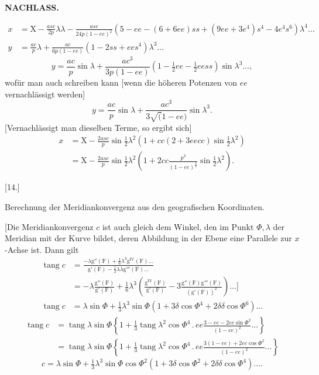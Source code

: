 \par\clearpage
\noindent{}\hfill{\small\textbf{NACHLASS.}}\hfill\null\par\medskip

\[
\begin{aligned}
x&=\mathrm X-\frac{asc}{2p}\lambda\lambda-\frac{asc}{24p(1-ee)^2}
 (5-ee-(6+6ee)ss+(9ee+3e^4)s^4-4e^4s^6)\lambda^4\ldots\\
y&=\frac{ac}{p}\lambda+\frac{ac}{6p(1-ee)}(1-2ss+ees^4)\lambda^3\ldots
\end{aligned}
\]
\noindent [oder]
\[
y=\frac{ac}{p}\sin\lambda+\frac{ac^3}{3p(1-ee)}
 (1-\tfrac12ee-\tfrac12eess)\sin\lambda^3\ldots,
\]
\noindent wofür man auch schreiben kann [wenn die höheren Potenzen von \(ee\) vernachlässigt werden]
\[
y=\frac{ac}{p}\sin\lambda+\frac{ac^3}{3\surd(1-ee)}\sin\lambda^3.
\]
[Vernachlässigt man dieselben Terme, so ergibt sich]
\[
\begin{aligned}
x&=\mathrm X-\frac{2asc}{p}\sin\tfrac12\lambda^2
 \left(1+cc(2+3eecc)\sin\tfrac12\lambda^2\right)\\
 &=\mathrm X-\frac{2asc}{p}\sin\tfrac12\lambda^2
 \left(1+2cc\frac{p^3}{(1-ee)^{\frac32}}\sin\tfrac12\lambda^2\right).
\end{aligned}
\]

\begin{center}
[14.]\par\medskip
Berechnung der Meridiankonvergenz aus den geografischen Koordinaten.
\end{center}
[Die Meridiankonvergenz \(c\) ist auch gleich dem Winkel, den im Punkt \(\Phi,\lambda\)
der Meridian mit der Kurve bildet, deren Abbildung in der Ebene eine Parallele
zur \(x\)-Achse ist. Dann gilt
\[
\begin{aligned}
\operatorname{tang}c&=\frac{-\lambda\mathrm g''(\mathrm F)+\tfrac16\lambda^3\mathrm g^{\mathrm{IV}}(\mathrm F)\ldots}
 {\mathrm g'(\mathrm F)-\tfrac12\lambda\lambda\mathrm g'''(\mathrm F)\ldots}\\
 &=-\lambda\frac{\mathrm g''(\mathrm F)}{\mathrm g'(\mathrm F)}
 +\tfrac16\lambda^3\left(\frac{\mathrm g^{\mathrm{IV}}(\mathrm F)}{\mathrm g'(\mathrm F)}
 -3\frac{\mathrm g''(\mathrm F)\mathrm g'''(\mathrm F)}{(\mathrm g'(\mathrm F))^2}\right)\ldots\mathclose{]}\\
\operatorname{tang}c&=\lambda\sin\Phi+\tfrac13\lambda^3\sin\Phi
 (1+3\delta\cos\Phi^4+2\delta\delta\cos\Phi^6)\ldots
\end{aligned}
\]
\noindent [oder]
\[
\begin{aligned}
\operatorname{tang}c&=\operatorname{tang}\lambda\sin\Phi
 \left\{1+\tfrac13\operatorname{tang}\lambda^2\cos\Phi^4\,.\,ee
 \frac{3-ee-2ee\sin\Phi^2}{(1-ee)^2}\ldots\right\}\\
 &=\operatorname{tang}\lambda\sin\Phi
 \left\{1+\tfrac13\operatorname{tang}\lambda^2\cos\Phi^4\,.\,ee
 \frac{3(1-ee)+2ee\cos\Phi^2}{(1-ee)^2}\ldots\right\}
\end{aligned}
\]
\[
c=\lambda\sin\Phi+\tfrac13\lambda^3\sin\Phi\cos\Phi^2
 (1+3\delta\cos\Phi^2+2\delta\delta\cos\Phi^4)\ldots.
\]

